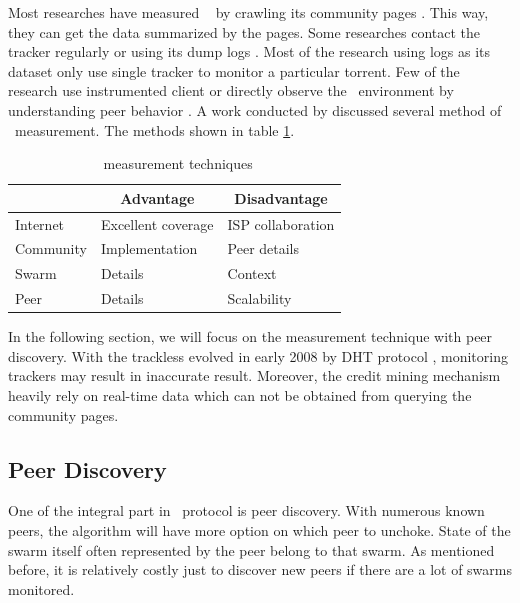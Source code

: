 Most researches have measured \bt~ by crawling its community pages \cite{2013:survivepriv:jia, 2005:bittorrentcooperation:andrade, 2014:userbehaviourprivate:jia, 2010:pubpriv:meulpolder, 2014:sustainabilitytorrent:chen, 2012:economicbt:kash, 2013:investmentcm:capota, 2009:demandsupplyres:andrade, 2011:interswarm:capota}. This way, they can get the data summarized by the pages. Some researches contact the tracker regularly or using its dump logs \cite{2011:yoshida:crawlbtnet, 2005:bittorrentcooperation:andrade,  2015:freeriderinbtcommunity:das, 2011:interswarm:capota}. Most of the research using logs as its dataset only use single tracker to monitor a particular torrent. Few of the research use instrumented client or directly observe the \bt~environment by understanding peer behavior \cite{2010:pubpriv:meulpolder, 2013:swarmevolution:su}. A work conducted by \citeauthor{2010:btworld:wojciechowski} discussed several method of \bt~measurement. The methods shown in table \ref{tbl:btmeasuremethod}.

\begin{table}[ht]
	\centering
	\caption{\bt~measurement techniques \cite{2010:btworld:wojciechowski}}
	\label{tbl:btmeasuremethod}
	\begin{tabular}{|l|l|l|}
		\hline
		\rowcolor[HTML]{C0C0C0} 
		\multicolumn{1}{|c|}{\cellcolor[HTML]{C0C0C0}\textbf{Level}} & \multicolumn{1}{c|}{\cellcolor[HTML]{C0C0C0}\textbf{Advantage}} & \multicolumn{1}{c|}{\cellcolor[HTML]{C0C0C0}\textbf{Disadvantage}} \\ \hline
		Internet & Excellent coverage & ISP collaboration \\ \hline
		Community & Implementation & Peer details \\ \hline
		Swarm & Details & Context \\ \hline
		Peer & Details & Scalability \\ \hline
	\end{tabular}
\end{table}

In the following section, we will focus on the measurement technique with peer discovery. With the trackless \bt evolved in early 2008 by DHT protocol \cite{2008:dht:loewenstern}, monitoring trackers may result in inaccurate result. Moreover, the credit mining mechanism heavily rely on real-time data which can not be obtained from querying the community pages.

\subsection{Peer Discovery}
One of the integral part in \bt~protocol is peer discovery. With numerous known peers, the algorithm will have more option on which peer to unchoke. State of the swarm itself often represented by the peer belong to that swarm. As mentioned before, it is relatively costly just to discover new peers if there are a lot of swarms monitored. 

